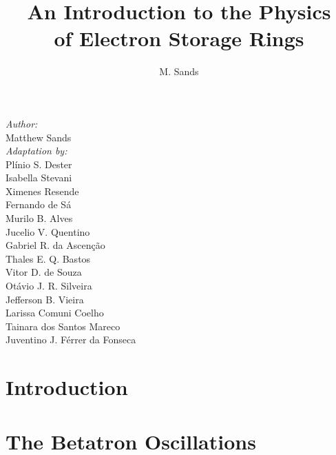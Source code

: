\documentclass[ebook,a4paper,12pt,oneside,openany]{memoir}
\title{An Introduction to the Physics\\ of Electron Storage Rings}
\author{M. Sands}
\numberwithin{equation}{chapter}
\begin{document}
\maketitle
\vspace{30mm}
\begin{flushright}
    \textit{Author:} \\
    \vspace{1mm}
        Matthew Sands \\
    \vspace{5mm}
    \textit{Adaptation by:} \\
    \vspace{1mm}
	Pl\'inio S. Dester \\
	Isabella Stevani \\
	Ximenes Resende \\
  Fernando de S\'a \\
  Murilo B. Alves \\
    Jucelio V. Quentino \\
    Gabriel R. da Ascenção \\
    Thales E. Q. Bastos \\
    Vitor D. de Souza \\
    Otávio J. R. Silveira \\
    Jefferson B. Vieira\\
    Larissa Comuni Coelho\\
    Tainara dos Santos Mareco\\
    Juventino J. Férrer da Fonseca
\end{flushright}

\thispagestyle{empty}

\newpage
\tableofcontents

\newpage


\chapter{Introduction} \label{ch:1}
    
    
    

\chapter{The Betatron Oscillations} \label{ch:2}
    
    
    
    
    
    
    
    
    
    
    
    
\end{document}
